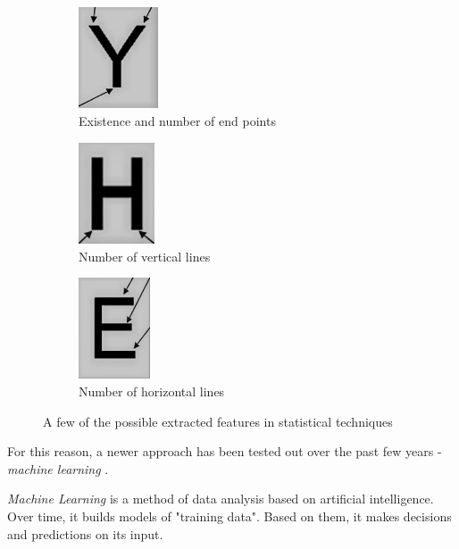 \begin{figure}[H]
\hspace*{\fill} %
\begin{subfigure}{0.30\textwidth}
\includegraphics[width=\linewidth,height=30mm]{img/characterClassification/statis_endPoint.jpg}
\caption{Existence and number of end points} \label{fig:1b}
\end{subfigure}
\hspace*{\fill} %
\begin{subfigure}{0.30\textwidth}
\includegraphics[width=\linewidth,height=30mm]{img/characterClassification/statis_vertical.jpg}
\caption{Number of vertical lines} \label{fig:1c}
\end{subfigure}
\begin{subfigure}{0.30\textwidth}
\includegraphics[width=\linewidth,height=30mm]{img/characterClassification/statis_horizontal.jpg}
\caption{Number of horizontal lines} \label{fig:1c}
\end{subfigure}
\caption{A few of the possible extracted features in statistical techniques \citep{vithlani2015structural}} \label{fig:1}
\end{figure}

For this reason, a newer approach has been tested out over the past few years - \emph{machine learning} \citep{characterClassification}.

\emph{Machine Learning} \citep{sebastiani2002machine} is a method of data analysis based on artificial intelligence. Over time, it builds models of "training data". Based on them, it makes decisions and predictions on its input. 

